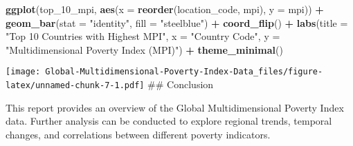 \documentclass[
]{article}
\newenvironment{Shaded}{\begin{snugshade}}{\end{snugshade}}
\newcommand{\AttributeTok}[1]{\textcolor[rgb]{0.13,0.29,0.53}{#1}}
\newcommand{\FunctionTok}[1]{\textcolor[rgb]{0.13,0.29,0.53}{\textbf{#1}}}
\newcommand{\NormalTok}[1]{#1}
\newcommand{\SpecialCharTok}[1]{\textcolor[rgb]{0.81,0.36,0.00}{\textbf{#1}}}
\newcommand{\StringTok}[1]{\textcolor[rgb]{0.31,0.60,0.02}{#1}}
\begin{document}
\begin{Shaded}
\begin{Highlighting}[]
\FunctionTok{ggplot}\NormalTok{(top\_10\_mpi, }\FunctionTok{aes}\NormalTok{(}\AttributeTok{x =} \FunctionTok{reorder}\NormalTok{(location\_code, mpi), }\AttributeTok{y =}\NormalTok{ mpi)) }\SpecialCharTok{+}
\FunctionTok{geom\_bar}\NormalTok{(}\AttributeTok{stat =} \StringTok{"identity"}\NormalTok{, }\AttributeTok{fill =} \StringTok{"steelblue"}\NormalTok{) }\SpecialCharTok{+}
\FunctionTok{coord\_flip}\NormalTok{() }\SpecialCharTok{+}
\FunctionTok{labs}\NormalTok{(}\AttributeTok{title =} \StringTok{"Top 10 Countries with Highest MPI"}\NormalTok{,}
\AttributeTok{x =} \StringTok{"Country Code"}\NormalTok{,}
\AttributeTok{y =} \StringTok{"Multidimensional Poverty Index (MPI)"}\NormalTok{) }\SpecialCharTok{+}
\FunctionTok{theme\_minimal}\NormalTok{()}
\end{Highlighting}
\end{Shaded}

\texttt{[image: Global-Multidimensional-Poverty-Index-Data\_files/figure-latex/unnamed-chunk-7-1.pdf]}
\#\# Conclusion

This report provides an overview of the Global Multidimensional Poverty
Index data. Further analysis can be conducted to explore regional
trends, temporal changes, and correlations between different poverty
indicators.
\end{document}

